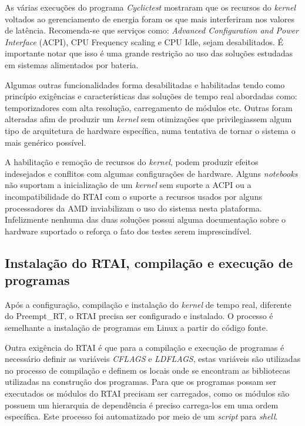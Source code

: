 As várias execuções do programa \textit{Cyclictest} mostraram que os recursos do \textit{kernel} voltados ao gerenciamento de energia foram os que mais interferiram nos valores de latência. Recomenda-se que serviços como: \textit{Advanced Configuration and Power Interface} (ACPI), CPU Frequency scaling e CPU Idle, sejam desabilitados. É importante notar que isso é uma grande restrição ao uso das soluções estudadas em sistemas alimentados por bateria.

Algumas outras funcionalidades forma desabilitadas  e habilitadas tendo como princípio exigências e características das soluções de tempo real abordadas como: temporizadores com alta resolução, carregamento de módulos etc. Outras foram alteradas afim de produzir um \textit{kernel} sem otimizações que privilegiassem algum tipo de arquitetura de hardware específica, numa tentativa de tornar o sistema o mais genérico possível.

A habilitação e remoção de recursos do \textit{kernel}, podem produzir efeitos indesejados e conflitos com algumas configurações de hardware. Alguns \textit{notebooks} não suportam a inicialização de um \textit{kernel} sem suporte a ACPI ou a incompatibilidade do RTAI com o suporte a recursos usados por alguns processadores da AMD inviabilizam o uso do sistema nesta plataforma. Infelizmente nenhuma das duas soluções possui alguma documentação sobre o hardware suportado o reforça o fato dos testes serem imprescindível.

\subsection{Instalação do RTAI, compilação e execução de programas}
Após a configuração, compilação e instalação do \textit{kernel} de tempo real, diferente do Preempt\_RT, o RTAI precisa ser configurado e instalado. O processo é semelhante a instalação de programas em Linux a partir do código fonte.

Outra exigência do RTAI é que para a compilação e execução de programas é necessário definir as variáveis \textit{CFLAGS} e \textit{LDFLAGS}, estas variáveis são utilizadas no processo de compilação e definem os locais onde se encontram as bibliotecas utilizadas na construção dos programas. Para que os programas possam ser executados os módulos do RTAI precisam ser carregados,  como os módulos são possuem um hierarquia de dependência é preciso carrega-los em uma ordem específica. Este processo foi automatizado por meio de um \textit{script} para \textit{shell}.


